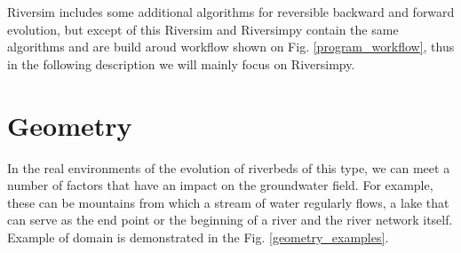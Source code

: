 \documentclass[]{pracamgr}
\begin{document}
    Riversim includes some additional algorithms for reversible backward and forward evolution, but except of this Riversim and Riversimpy contain the same algorithms and are build aroud workflow shown on Fig. \ref{program_workflow}, thus in the following description we will mainly focus on Riversimpy.

    \section{Geometry}
      
      In the real environments of the evolution of riverbeds of this type, we can meet a number of factors that have an impact on the groundwater field. For example, these can be mountains from which a stream of water regularly flows, a lake that can serve as the end point or the beginning of a river and the river network itself. Example of domain is demonstrated in the Fig. \ref{geometry_examples}.
      
\end{document}
